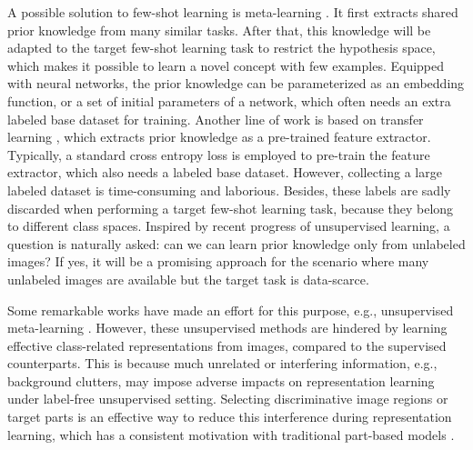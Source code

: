 \documentclass{article}
\begin{document}
A possible solution to few-shot learning is meta-learning \cite{pmlr-v70-finn17a,vinyals2016matching,Ravi2017OptimizationAA,snell2017prototypical,peng2019few}. It first extracts shared prior knowledge from many similar tasks. After that, this knowledge will be adapted to the target few-shot learning task to restrict the hypothesis space, which makes it possible to learn a novel concept with few examples. Equipped with neural networks, the prior knowledge can be parameterized as an embedding function, or a set of initial parameters of a network, which often needs an extra labeled base dataset for training. 
Another line of work is based on transfer learning \cite{10.1007/978-3-030-58568-6_16,Dhillon2020A}, which extracts prior knowledge as a pre-trained feature extractor. Typically, a standard cross entropy loss is employed to pre-train the feature extractor, which also needs a labeled base dataset. However, collecting a large labeled dataset is time-consuming and laborious. Besides, these labels are sadly discarded when performing a target few-shot learning task, because they belong to different class spaces. Inspired by recent progress of unsupervised learning, a question is naturally asked: can we can learn prior knowledge only from unlabeled images? If yes, it will be a promising approach for the scenario where many unlabeled images are available but the target task is data-scarce.

Some remarkable works have made an effort for this purpose, e.g., unsupervised meta-learning \cite{hsu2018unsupervised,khodadadeh2019unsupervised}. However, these unsupervised methods are hindered by learning effective class-related representations from images, compared to the supervised counterparts. This is because much unrelated or interfering information, e.g., background clutters, may 
impose adverse impacts on representation learning
under label-free unsupervised setting. Selecting discriminative image regions or target parts is an effective way to reduce this interference during representation learning, which has a consistent motivation with traditional part-based models \cite{pedro2009part}.
\end{document}
